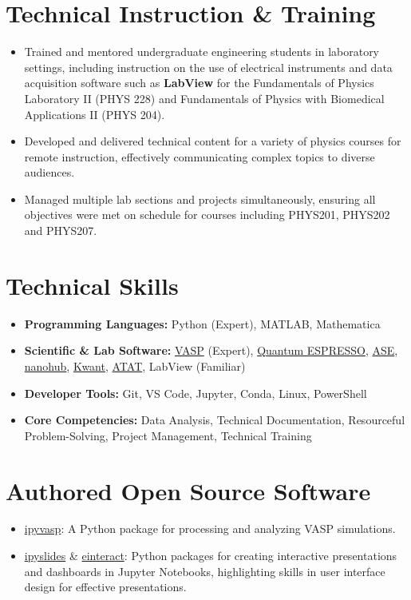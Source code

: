 \documentclass[letter,11pt]{article}
\begin{document}
\section{Technical Instruction \& Training}
\begin{itemize}
    \item Trained and mentored undergraduate engineering students in laboratory settings, including instruction on the use of electrical instruments and data acquisition software such as \textbf{LabView} for the Fundamentals of Physics Laboratory II (PHYS 228) and Fundamentals of Physics with Biomedical Applications II (PHYS 204).
    \item Developed and delivered technical content for a variety of physics courses for remote instruction, effectively communicating complex topics to diverse audiences.
    \item Managed multiple lab sections and projects simultaneously, ensuring all objectives were met on schedule for courses including PHYS201, PHYS202 and PHYS207.
\end{itemize}


\section{Technical Skills}
\begin{itemize}
    \item \textbf{Programming Languages:} Python (Expert), MATLAB, Mathematica
    \item \textbf{Scientific \& Lab Software:} \href{https://www.vasp.at/}{VASP} (Expert), \href{https://www.quantum-espresso.org/}{Quantum ESPRESSO}, \href{https://wiki.fysik.dtu.dk/ase/}{ASE}, \href{https://nanohub.org}{nanohub}, \href{https://kwant-project.org}{Kwant}, \href{https://axelvandewalle.github.io/www-avdw/atat/}{ATAT}, LabView (Familiar)
    \item \textbf{Developer Tools:} Git, VS Code, Jupyter, Conda, Linux, PowerShell
    \item \textbf{Core Competencies:} Data Analysis, Technical Documentation, Resourceful Problem-Solving, Project Management, Technical Training
\end{itemize}

\section{Authored Open Source Software}
\begin{itemize}
    \item \href{https://github.com/asaboor-gh/ipyvasp}{ipyvasp}: A Python package for processing and analyzing VASP simulations.
    \item \href{https://github.com/asaboor-gh/ipyslides}{ipyslides} \& \href{https://github.com/asaboor-gh/einteract}{einteract}: Python packages for creating interactive presentations and dashboards in Jupyter Notebooks, highlighting skills in user interface design for effective presentations.
\end{itemize}
\end{document}
